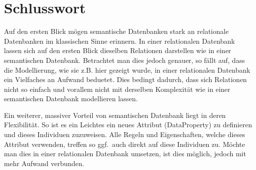 \chapter{Schlusswort}
\label{chap:schlusswort}


Auf den ersten Blick mögen semantische Datenbanken stark an relationale Datenbanken im klassischen Sinne erinnern. In einer relationalen Datenbank lassen sich auf den ersten Blick dieselben Relationen darstellen wie in einer semantischen Datenbank. Betrachtet man dies jedoch genauer, so fällt auf, dass die Modellierung, wie sie z.B. hier gezeigt wurde, in einer relationalen Datenbank ein Vielfaches an Aufwand beduetet. Dies bedingt dadurch, dass sich Relationen nicht so einfach und vorallem nicht mit derselben Komplexität wie in einer semantischen Datenbank modellieren lassen. %

Ein weiterer, massiver Vorteil von semantischen Datenbank liegt in deren Flexibilität. So ist es ein Leichtes ein neues Attribut (DataProperty) zu definieren und dieses Individuen zuzuweisen. Alle Regeln und Eigenschaften, welche dieses Attribut verwenden, treffen so ggf.\ auch direkt auf diese Individuen zu. Möchte man dies in einer relationalen Datenbank umsetzen, ist dies möglich, jedoch mit mehr Aufwand verbunden.
